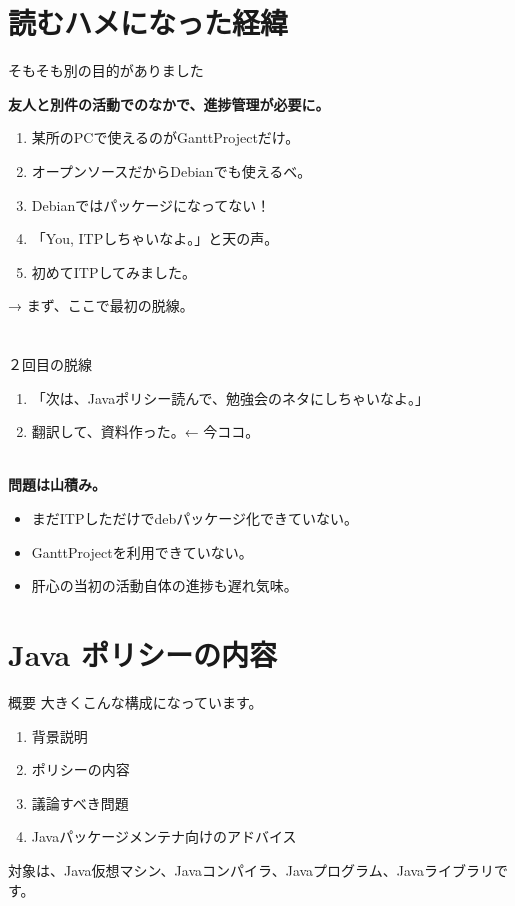 \frame{\titlepage{}}

\section{読むハメになった経緯}
\begin{frame}[containsverbatim]{そもそも別の目的がありました}
\begin{center}\bfseries
友人と別件の活動でのなかで、進捗管理が必要に。

\begin{enumerate}
 \item 某所のPCで使えるのがGanttProjectだけ。
 \item オープンソースだからDebianでも使えるベ。
 \item Debianではパッケージになってない！
 \item 「You, ITPしちゃいなよ。」と天の声。
 \item 初めてITPしてみました。
\end{enumerate}
→ まず、ここで最初の脱線。
\end{center}

\end{frame}

\section{}
\begin{frame}[containsverbatim]{２回目の脱線}
 \begin{center}
  \begin{enumerate}
   \item 「次は、Javaポリシー読んで、勉強会のネタにしちゃいなよ。」
   \item 翻訳して、資料作った。← 今ココ。
  \end{enumerate}


 \textbf{\\問題は山積み。}
  \begin{itemize}
   \item まだITPしただけでdebパッケージ化できていない。
   \item GanttProjectを利用できていない。
   \item 肝心の当初の活動自体の進捗も遅れ気味。
  \end{itemize}
 \end{center}
\end{frame}

\section{Java ポリシーの内容}
\begin{frame}{概要}
 大きくこんな構成になっています。
 \begin{enumerate}
  \item 背景説明
  \item ポリシーの内容
  \item 議論すべき問題
  \item Javaパッケージメンテナ向けのアドバイス
 \end{enumerate}
 対象は、Java仮想マシン、Javaコンパイラ、Javaプログラム、Javaライブラリで
 す。
\end{frame}

